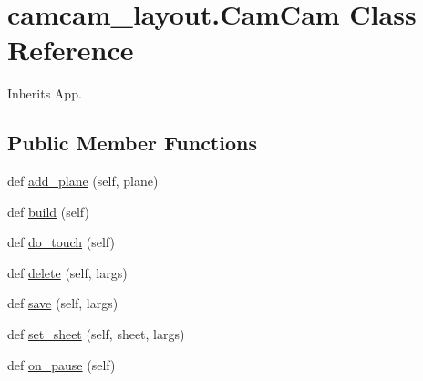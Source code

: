 \hypertarget{classcamcam__layout_1_1_cam_cam}{}\section{camcam\+\_\+layout.\+Cam\+Cam Class Reference}
\label{classcamcam__layout_1_1_cam_cam}


Inherits App.

\subsection*{Public Member Functions}
\begin{DoxyCompactItemize}
\item 
def \hyperlink{classcamcam__layout_1_1_cam_cam_aae15201c08000c6d0a01b947d0e99757}{add\+\_\+plane} (self, plane)
\item 
def \hyperlink{classcamcam__layout_1_1_cam_cam_a11c2be8d09bb6c1d7142bc79bff2ba0c}{build} (self)
\item 
def \hyperlink{classcamcam__layout_1_1_cam_cam_a699e53b6f63acfe6b457b6b91e1936f3}{do\+\_\+touch} (self)
\item 
def \hyperlink{classcamcam__layout_1_1_cam_cam_a55cbd693f0e23a01969822a11cde6d2a}{delete} (self, largs)
\item 
def \hyperlink{classcamcam__layout_1_1_cam_cam_a4247170d23fc1125ae1fcb918a99c60a}{save} (self, largs)
\item 
def \hyperlink{classcamcam__layout_1_1_cam_cam_a5a21300e0c1b0fa919a4793bbdafc154}{set\+\_\+sheet} (self, sheet, largs)
\item 
def \hyperlink{classcamcam__layout_1_1_cam_cam_ac3bdb03463dc584fb1baaae9a6b5e4e3}{on\+\_\+pause} (self)
\end{DoxyCompactItemize}
